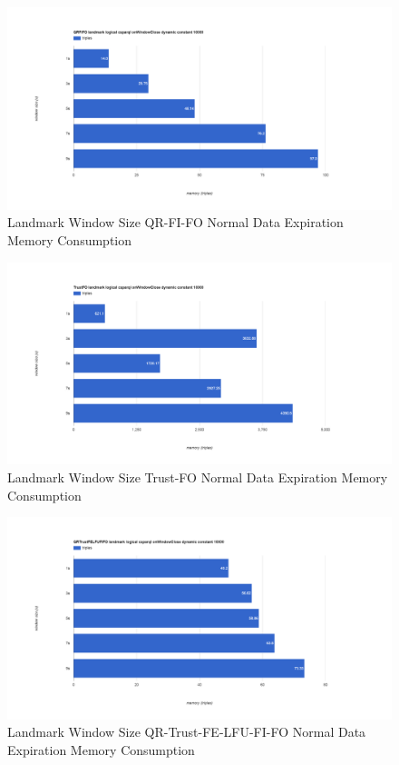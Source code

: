 \begin{figure}[!htbp]
	\centering
    \includegraphics[width=\textwidth]{img/app3-land-ws-qrfifo-normal-m.png}
    \caption{Landmark Window Size QR-FI-FO Normal Data Expiration Memory Consumption}
\end{figure}
\begin{figure}[!htbp]
	\centering
    \includegraphics[width=\textwidth]{img/app3-land-ws-trustfo-normal-m.png}
    \caption{Landmark Window Size Trust-FO Normal Data Expiration Memory Consumption}
\end{figure}
\begin{figure}[!htbp]
	\centering
    \includegraphics[width=\textwidth]{img/app3-land-ws-qrtrustfelfufifo-normal-m.png}
    \caption{Landmark Window Size QR-Trust-FE-LFU-FI-FO Normal Data Expiration Memory Consumption}
\end{figure}


